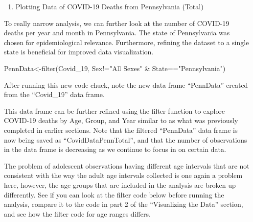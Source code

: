 \documentclass[
]{article}
\newenvironment{Shaded}{\begin{snugshade}}{\end{snugshade}}
\newcommand{\FunctionTok}[1]{\textcolor[rgb]{0.00,0.00,0.00}{#1}}
\newcommand{\NormalTok}[1]{#1}
\newcommand{\OtherTok}[1]{\textcolor[rgb]{0.56,0.35,0.01}{#1}}
\newcommand{\SpecialCharTok}[1]{\textcolor[rgb]{0.00,0.00,0.00}{#1}}
\newcommand{\StringTok}[1]{\textcolor[rgb]{0.31,0.60,0.02}{#1}}
\providecommand{\tightlist}{%
  \setlength{\itemsep}{0pt}\setlength{\parskip}{0pt}}
\begin{document}
\begin{enumerate}
\def\labelenumi{\arabic{enumi}.}
\setcounter{enumi}{4}
\tightlist
\item
  Plotting Data of COVID-19 Deaths from Pennsylvania (Total)
\end{enumerate}

To really narrow analysis, we can further look at the number of COVID-19
deaths per year and month in Pennsylvania. The state of Pennsylvania was
chosen for epidemiological relevance. Furthermore, refining the dataset
to a single state is beneficial for improved data visualization.

\begin{Shaded}
\begin{Highlighting}[]
\NormalTok{PennData}\OtherTok{\textless{}{-}}\FunctionTok{filter}\NormalTok{(Covid\_19, Sex}\SpecialCharTok{!=}\StringTok{"All Sexes"} \SpecialCharTok{\&}\NormalTok{ State}\SpecialCharTok{==}\StringTok{"Pennsylvania"}\NormalTok{)}
\end{Highlighting}
\end{Shaded}

After running this new code chuck, note the new data frame ``PennData''
created from the ``Covid\_19'' data frame.

This data frame can be further refined using the filter function to
explore COVID-19 deaths by Age, Group, and Year similar to as what was
previously completed in earlier sections. Note that the filtered
``PennData'' data frame is now being saved as ``CovidDataPennTotal'',
and that the number of observations in the data frame is decreasing as
we continue to focus in on certain data.

The problem of adolescent observations having different age intervals
that are not consistent with the way the adult age intervals collected
is one again a problem here, however, the age groups that are included
in the analysis are broken up differently. See if you can look at the
filter code below before running the analysis, compare it to the code in
part 2 of the ``Visualizing the Data'' section, and see how the filter
code for age ranges differs.
\end{document}
